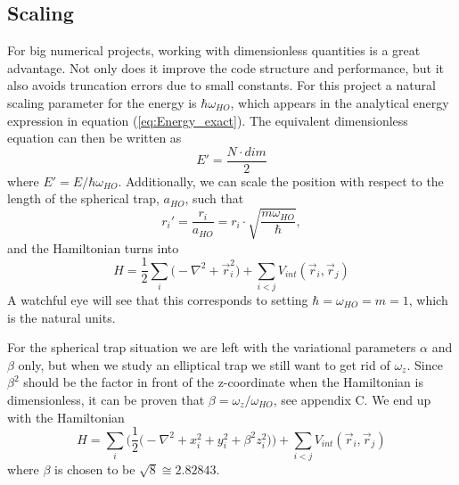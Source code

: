 \documentclass[norsk,a4paper,12pt]{article}
\begin{document}
\subsection{Scaling} \label{sec:scaling}
For big numerical projects, working with dimensionless quantities is a great advantage. Not only does it improve the code structure and performance, but it also avoids truncation errors due to small constants. For this project a natural scaling parameter for the energy is $\hbar\omega_{HO}$, which appears in the analytical energy expression in equation (\ref{eq:Energy_exact}). The equivalent dimensionless equation can then be written as
\begin{equation}
E'=\frac{N\cdot dim}{2}
\end{equation}
where $E'=E/\hbar\omega_{HO}$. Additionally, we can scale the position with respect to the length of the spherical trap, $a_{HO}$, such that 
\begin{equation}
r_i'=\frac{r_i}{a_{HO}}=r_i\cdot\sqrt{\frac{m\omega_{HO}}{\hbar}},
\end{equation}
and the Hamiltonian turns into
\begin{equation}
H=\frac{1}{2}\sum_i\Big(-\nabla^2 + \vec{r}_i^2\Big)+\sum_{i<j}V_{int}(\vec{r}_i,\vec{r}_j)
\end{equation}
A watchful eye will see that this corresponds to setting $\hbar=\omega_{HO}=m=1$, which is the natural units. 

For the spherical trap situation we are left with the variational parameters $\alpha$ and $\beta$ only, but when we study an elliptical trap we still want to get rid of $\omega_z$. Since $\beta^2$ should be the factor in front of the z-coordinate when the Hamiltonian is dimensionless, it can be proven that $\beta=\omega_z/\omega_{HO}$, see appendix C. We end up with the Hamiltonian
\begin{equation}
H=\sum_i\bigg(\frac{1}{2}\Big(-\nabla^2 + x_i^2 + y_i^2 + \beta^2z_i^2\Big)\bigg)+\sum_{i<j}V_{int}(\vec{r}_i,\vec{r}_j)
\end{equation} 
where $\beta$ is chosen to be $\sqrt{8}\cong2.82843$.
\end{document}
